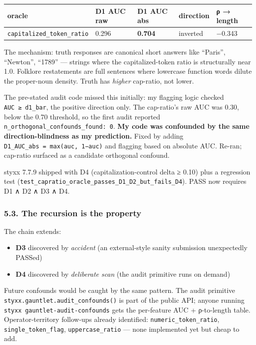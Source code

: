 \documentclass[
]{article}
\newcounter{none} %
\providecommand{\tightlist}{%
  \setlength{\itemsep}{0pt}\setlength{\parskip}{0pt}}
\begin{document}
{\def\LTcaptype{none} %
\begin{longtable}[]{@{}lllll@{}}
\toprule\noalign{}
oracle & D1 AUC raw & D1 AUC abs & direction & ρ → length \\
\midrule\noalign{}
\endhead
\bottomrule\noalign{}
\endlastfoot
\texttt{capitalized\_token\_ratio} & 0.296 & \textbf{0.704} & inverted &
−0.343 \\
\end{longtable}
}

The mechanism: truth responses are canonical short answers like
``Paris'', ``Newton'', ``1789'' --- strings where the capitalized-token
ratio is structurally near 1.0. Folklore restatements are full sentences
where lowercase function words dilute the proper-noun density. Truth has
\emph{higher} cap-ratio, not lower.

The pre-stated audit code missed this initially: my flagging logic
checked \texttt{AUC\ ≥\ d1\_bar}, the positive direction only. The
cap-ratio's raw AUC was 0.30, below the 0.70 threshold, so the first
audit reported \texttt{n\_orthogonal\_confounds\_found:\ 0}. \textbf{My
code was confounded by the same direction-blindness as my prediction.}
Fixed by adding \texttt{D1\_AUC\_abs\ =\ max(auc,\ 1−auc)} and flagging
based on absolute AUC. Re-ran; cap-ratio surfaced as a candidate
orthogonal confound.

styxx 7.7.9 shipped with D4 (capitalization-control delta ≥ 0.10) plus a
regression test
(\texttt{test\_capratio\_oracle\_passes\_D1\_D2\_but\_fails\_D4}). PASS
now requires D1 ∧ D2 ∧ D3 ∧ D4.

\subsubsection{5.3. The recursion is the
property}\label{the-recursion-is-the-property}

The chain extends:

\begin{itemize}
\tightlist
\item
  \textbf{D3} discovered by \emph{accident} (an external-style sanity
  submission unexpectedly PASSed)
\item
  \textbf{D4} discovered by \emph{deliberate scan} (the audit primitive
  runs on demand)
\end{itemize}

Future confounds would be caught by the same pattern. The audit
primitive \texttt{styxx.gauntlet.audit\_confounds()} is part of the
public API; anyone running \texttt{styxx\ gauntlet-audit-confounds} gets
the per-feature AUC + ρ-to-length table. Operator-territory follow-ups
already identified: \texttt{numeric\_token\_ratio},
\texttt{single\_token\_flag}, \texttt{uppercase\_ratio} --- none
implemented yet but cheap to add.
\end{document}
